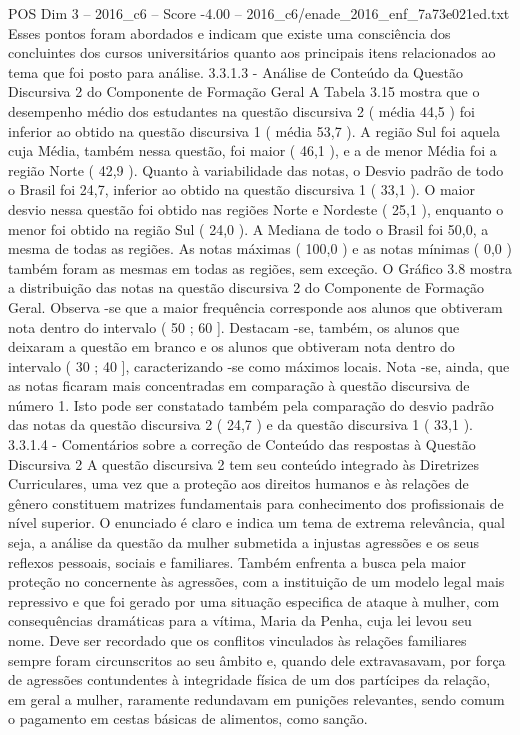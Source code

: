 \begin{textsample}{POS Dim 3 – 2016\_c6 – Score -4.00 – 2016\_c6/enade\_2016\_enf\_7a73e021ed.txt}
Esses pontos foram abordados e indicam que existe uma consciência dos concluintes dos cursos universitários quanto aos principais itens relacionados ao tema que foi posto para análise. 3.3.1.3 - Análise de Conteúdo da Questão Discursiva 2 do Componente de Formação Geral A Tabela 3.15 mostra que o desempenho médio dos estudantes na questão discursiva 2 ( média 44,5 ) foi inferior ao obtido na questão discursiva 1 ( média 53,7 ).
A região Sul foi aquela cuja Média, também nessa questão, foi maior ( 46,1 ), e a de menor Média foi a região Norte ( 42,9 ).
Quanto à variabilidade das notas, o Desvio padrão de todo o Brasil foi 24,7, inferior ao obtido na questão discursiva 1 ( 33,1 ).
O maior desvio nessa questão foi obtido nas regiões Norte e Nordeste ( 25,1 ), enquanto o menor foi obtido na região Sul ( 24,0 ).
A Mediana de todo o Brasil foi 50,0, a mesma de todas as regiões.
As notas máximas ( 100,0 ) e as notas mínimas ( 0,0 ) também foram as mesmas em todas as regiões, sem exceção.
O Gráfico 3.8 mostra a distribuição das notas na questão discursiva 2 do Componente de Formação Geral.
Observa -se que a maior frequência corresponde aos alunos que obtiveram nota dentro do intervalo ( 50 ; 60 ].
Destacam -se, também, os alunos que deixaram a questão em branco e os alunos que obtiveram nota dentro do intervalo ( 30 ; 40 ], caracterizando -se como máximos locais.
Nota -se, ainda, que as notas ficaram mais concentradas em comparação à questão discursiva de número 1.
Isto pode ser constatado também pela comparação do desvio padrão das notas da questão discursiva 2 ( 24,7 ) e da questão discursiva 1 ( 33,1 ). 3.3.1.4 - Comentários sobre a correção de Conteúdo das respostas à Questão Discursiva 2 A questão discursiva 2 tem seu conteúdo integrado às Diretrizes Curriculares, uma vez que a proteção aos direitos humanos e às relações de gênero constituem matrizes fundamentais para conhecimento dos profissionais de nível superior.
O enunciado é claro e indica um tema de extrema relevância, qual seja, a análise da questão da mulher submetida a injustas agressões e os seus reflexos pessoais, sociais e familiares.
Também enfrenta a busca pela maior proteção no concernente às agressões, com a instituição de um modelo legal mais repressivo e que foi gerado por uma situação especifica de ataque à mulher, com consequências dramáticas para a vítima, Maria da Penha, cuja lei levou seu nome.
Deve ser recordado que os conflitos vinculados às relações familiares sempre foram circunscritos ao seu âmbito e, quando dele extravasavam, por força de agressões contundentes à integridade física de um dos partícipes da relação, em geral a mulher, raramente redundavam em punições relevantes, sendo comum o pagamento em cestas básicas de alimentos, como sanção.

\end{textsample}
